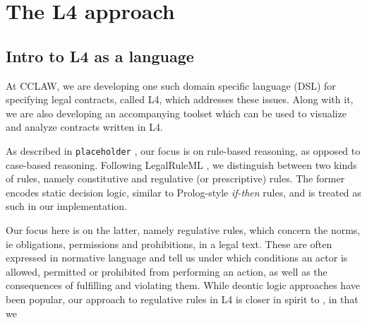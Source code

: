 \documentclass{article}
\begin{document}

\section{The L4 approach}

\subsection{Intro to L4 as a language}
At CCLAW, we are developing one such domain specific language (DSL) for
specifying legal contracts, called L4, which addresses these issues.
Along with it, we are also developing an accompanying toolset which can be used
to visualize and analyze contracts written in L4.

As described in \texttt{placeholder}
,
our focus is on rule-based reasoning, as opposed to case-based reasoning.
Following LegalRuleML , we distinguish between two kinds
of rules, namely constitutive and regulative (or prescriptive) rules.
The former encodes static decision logic, similar to Prolog-style
\textit{if-then} rules, and is treated as such in our implementation.

Our focus here is on the latter, namely regulative rules, which concern the
norms, ie obligations, permissions and prohibitions, in a legal text.
These are often expressed in normative language and
tell us under which conditions an actor is allowed, permitted or
prohibited from performing an action, as well as the consequences of fulfilling
and violating them.
While deontic logic approaches have been popular,
our approach to regulative rules in L4 is closer in spirit to
\cite{real_time_contract_automata, normative_diags_diogo}, in that we
\end{document}
